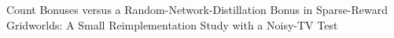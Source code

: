 Count Bonuses versus a Random-Network-Distillation Bonus in Sparse-Reward Gridworlds: A Small Reimplementation Study with a Noisy-TV Test
